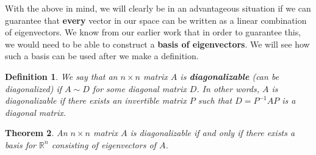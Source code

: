 \documentclass[12pt,letterpaper]{article}
\newtheorem{theorem}{Theorem}
\newtheorem{definition}[theorem]{Definition}
\newcommand{\R}{\mathbb{R}}
\begin{document}
With the above in mind, we will clearly be in an advantageous situation if we can guarantee that \textbf{every} vector in our space can be written as a linear combination of eigenvectors. We know from our earlier work that in order to guarantee this, we would need to be able to construct a \textbf{basis of eigenvectors}. We will see how such a basis can be used after we make a definition.

\begin{definition}
 We say that an $n\times n$ matrix $A$ is \textbf{diagonalizable} (can be diagonalized) if $A\sim D$ for some diagonal matrix $D$. In other words, $A$ is diagonalizable if there exists an invertible matrix $P$ such that $D=P^{-1}AP$ is a diagonal matrix.
\end{definition}
\begin{theorem}\label{thm:diagonalization}
 An $n\times n$ matrix $A$ is diagonalizable if and only if there exists a basis for $\R^n$ consisting of eigenvectors of $A$.
\end{theorem}
\end{document}
